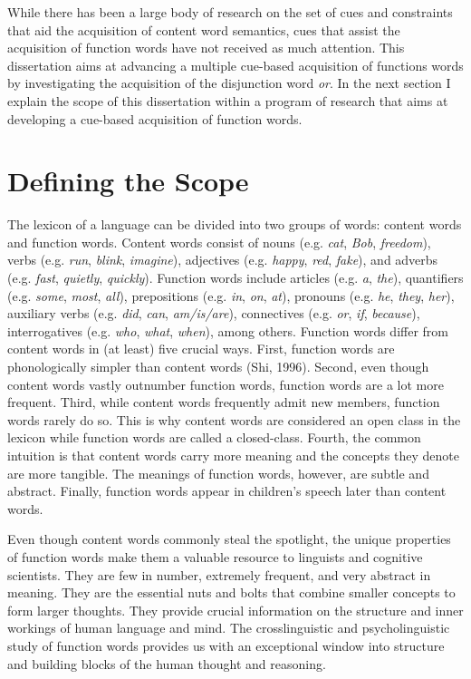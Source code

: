 \documentclass[oneside]{report}
\theoremstyle{definition}
\theoremstyle{definition}
\theoremstyle{definition}
\theoremstyle{remark}
\begin{document}
While there has been a large body of research on the set of cues and
constraints that aid the acquisition of content word semantics, cues
that assist the acquisition of function words have not received as much
attention. This dissertation aims at advancing a multiple cue-based
acquisition of functions words by investigating the acquisition of the
disjunction word \emph{or}. In the next section I explain the scope of
this dissertation within a program of research that aims at developing a
cue-based acquisition of function words.

\section{Defining the Scope}\label{defining-the-scope}

The lexicon of a language can be divided into two groups of words:
content words and function words. Content words consist of nouns (e.g.
\emph{cat}, \emph{Bob}, \emph{freedom}), verbs (e.g. \emph{run},
\emph{blink}, \emph{imagine}), adjectives (e.g. \emph{happy},
\emph{red}, \emph{fake}), and adverbs (e.g. \emph{fast}, \emph{quietly},
\emph{quickly}). Function words include articles (e.g. \emph{a},
\emph{the}), quantifiers (e.g. \emph{some}, \emph{most}, \emph{all}),
prepositions (e.g. \emph{in}, \emph{on}, \emph{at}), pronouns (e.g.
\emph{he}, \emph{they}, \emph{her}), auxiliary verbs (e.g. \emph{did},
\emph{can}, \emph{am/is/are}), connectives (e.g. \emph{or}, \emph{if},
\emph{because}), interrogatives (e.g. \emph{who}, \emph{what},
\emph{when}), among others. Function words differ from content words in
(at least) five crucial ways. First, function words are phonologically
simpler than content words (Shi, 1996). Second, even though content
words vastly outnumber function words, function words are a lot more
frequent. Third, while content words frequently admit new members,
function words rarely do so. This is why content words are considered an
open class in the lexicon while function words are called a
closed-class. Fourth, the common intuition is that content words carry
more meaning and the concepts they denote are more tangible. The
meanings of function words, however, are subtle and abstract. Finally,
function words appear in children's speech later than content words.

Even though content words commonly steal the spotlight, the unique
properties of function words make them a valuable resource to linguists
and cognitive scientists. They are few in number, extremely frequent,
and very abstract in meaning. They are the essential nuts and bolts that
combine smaller concepts to form larger thoughts. They provide crucial
information on the structure and inner workings of human language and
mind. The crosslinguistic and psycholinguistic study of function words
provides us with an exceptional window into structure and building
blocks of the human thought and reasoning.
\end{document}
